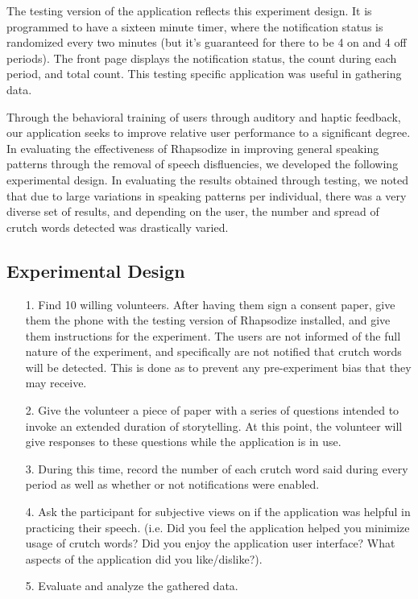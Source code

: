 \documentclass{sigchi}
\begin{document}
The testing version of the application reflects this experiment design. It is programmed to have a sixteen minute timer, where the notification status is randomized every two minutes (but it's guaranteed for there to be 4 on and 4 off periods). The front page displays the notification status, the count during each period, and total count. This testing specific application was useful in gathering data.

Through the behavioral training of users through auditory and haptic feedback, our application seeks to improve relative user performance to a significant degree. In evaluating the effectiveness of Rhapsodize in improving general speaking patterns through the removal of speech disfluencies, we developed the following experimental design. In evaluating the results obtained through testing, we noted that due to large variations in speaking patterns per individual, there was a very diverse set of results, and depending on the user, the number and spread of crutch words detected was drastically varied.

\subsection{Experimental Design}
\begin{itemize}
\item[1.] Find 10 willing volunteers. After having them sign a consent paper, give them the phone with the testing version of Rhapsodize installed, and give them instructions for the experiment. The users are not informed of the full nature of the experiment, and specifically are not notified that crutch words will be detected. This is done as to prevent any pre-experiment bias that they may receive.
\item[2.] Give the volunteer a piece of paper with a series of questions intended to invoke an extended duration of storytelling. At this point, the volunteer will give responses to these questions while the application is in use.
\item[3.] During this time, record the number of each crutch word said during every period as well as whether or not notifications were enabled.
\item[4.] Ask the participant for subjective views on if the application was helpful in practicing their speech. (i.e. Did you feel the application helped you minimize usage of crutch words? Did you enjoy the application user interface? What aspects of the application did you like/dislike?).
\item[5.] Evaluate and analyze the gathered data. 
\end{itemize}
\end{document}
